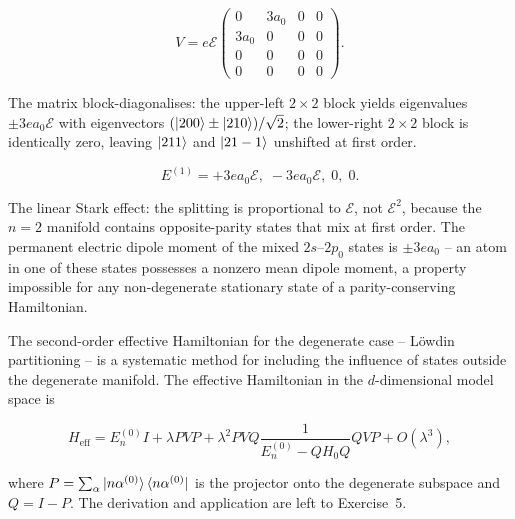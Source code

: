 \begin{linenomath}
\begin{equation*}
V = e\mathcal{E}
\begin{pmatrix}
0 & 3a_{0} & 0 & 0 \\
3a_{0} & 0 & 0 & 0 \\
0 & 0 & 0 & 0 \\
0 & 0 & 0 & 0
\end{pmatrix}.
\end{equation*}
\end{linenomath}
The matrix block-diagonalises: the upper-left $2\times2$ block yields eigenvalues $\pm 3ea_{0}\mathcal{E}$ with eigenvectors $(\ket{200}\pm\ket{210})/\sqrt{2}$; the lower-right $2\times2$ block is identically zero, leaving $\ket{211}$ and $\ket{21-1}$ unshifted at first order.
\begin{linenomath}
\begin{equation}
E^{(1)} = +3ea_{0}\mathcal{E},\; -3ea_{0}\mathcal{E},\; 0,\; 0.
\label{eq:linear-stark-n2}
\end{equation}
\end{linenomath}
The linear Stark effect: the splitting is proportional to $\mathcal{E}$, not $\mathcal{E}^{2}$, because the $n=2$ manifold contains opposite-parity states that mix at first order. The permanent electric dipole moment of the mixed $2s$--$2p_{0}$ states is $\pm 3ea_{0}$ -- an atom in one of these states possesses a nonzero mean dipole moment, a property impossible for any non-degenerate stationary state of a parity-conserving Hamiltonian.

\begin{note}
The second-order effective Hamiltonian for the degenerate case -- L\"owdin partitioning -- is a systematic method for including the influence of states outside the degenerate manifold. The effective Hamiltonian in the $d$-dimensional model space is
\begin{linenomath}
\begin{equation*}
H_{\text{eff}} = E_{n}^{(0)}I + \lambda P V P + \lambda^{2} P V Q\frac{1}{E_{n}^{(0)}-QH_{0}Q}Q V P + O(\lambda^{3}),
\end{equation*}
\end{linenomath}
where $P = \sum_{\alpha}\ket{n\alpha^{(0)}}\bra{n\alpha^{(0)}}$ is the projector onto the degenerate subspace and $Q = I-P$. The derivation and application are left to Exercise~5.
\end{note}

